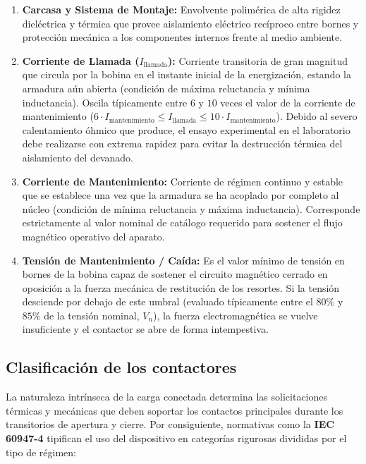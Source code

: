 \begin{enumerate}
    \item\textbf{Carcasa y Sistema de Montaje:} Envolvente polimérica de alta rigidez dieléctrica y térmica que provee aislamiento eléctrico recíproco entre bornes y protección mecánica a los componentes internos frente al medio ambiente.
    \item\textbf{Corriente de Llamada ($I_{\text{llamada}}$):} Corriente transitoria de gran magnitud que circula por la bobina en el instante inicial de la energización, estando la armadura aún abierta (condición de máxima reluctancia y mínima inductancia). Oscila típicamente entre $6$ y $10$ veces el valor de la corriente de mantenimiento ($6 \cdot I_{\text{mantenimiento}} \le I_{\text{llamada}} \le 10 \cdot I_{\text{mantenimiento}}$). Debido al severo calentamiento óhmico que produce, el ensayo experimental en el laboratorio debe realizarse con extrema rapidez para evitar la destrucción térmica del aislamiento del devanado.
    
    \item\textbf{Corriente de Mantenimiento:} Corriente de régimen continuo y estable que se establece una vez que la armadura se ha acoplado por completo al núcleo (condición de mínima reluctancia y máxima inductancia). Corresponde estrictamente al valor nominal de catálogo requerido para sostener el flujo magnético operativo del aparato.
    
    \item\textbf{Tensión de Mantenimiento / Caída:} Es el valor mínimo de tensión en bornes de la bobina capaz de sostener el circuito magnético cerrado en oposición a la fuerza mecánica de restitución de los resortes. Si la tensión desciende por debajo de este umbral (evaluado típicamente entre el $80\%$ y $85\%$ de la tensión nominal, $V_n$), la fuerza electromagnética se vuelve insuficiente y el contactor se abre de forma intempestiva.
\end{enumerate}

\subsection{Clasificación de los contactores}

La naturaleza intrínseca de la carga conectada determina las solicitaciones térmicas y mecánicas que deben soportar los contactos principales durante los transitorios de apertura y cierre. Por consiguiente, normativas como la \textbf{IEC 60947-4} tipifican el uso del dispositivo en categorías rigurosas divididas por el tipo de régimen:

